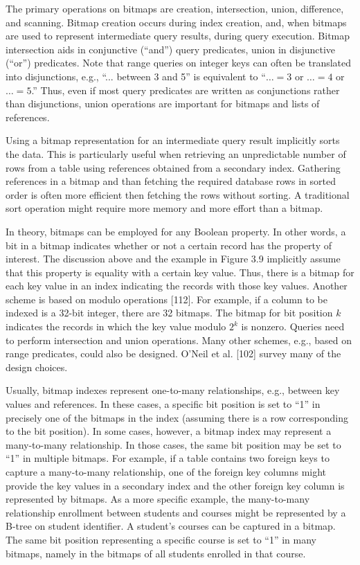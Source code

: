 The primary operations on bitmaps are creation, intersection, union,
difference, and scanning. Bitmap creation occurs during index creation,
and, when bitmaps are used to represent intermediate query results,
during query execution. Bitmap intersection aids in conjunctive
(``and'') query predicates, union in disjunctive (``or'') predicates.
Note that range queries on integer keys can often be translated into
disjunctions, e.g., ``... between 3 and 5'' is equivalent to
``$\ldots = 3$ or $\ldots = 4$ or $\ldots = 5$.'' Thus, even if
most query predicates are written as conjunctions rather than
disjunctions, union operations are important for bitmaps and lists of
references.

Using a bitmap representation for an intermediate query result
implicitly sorts the data. This is particularly useful when retrieving
an unpredictable number of rows from a table using references obtained
from a secondary index. Gathering references in a bitmap and than
fetching the required database rows in sorted order is often more
efficient then fetching the rows without sorting. A traditional sort
operation might require more memory and more effort than a bitmap.

In theory, bitmaps can be employed for any Boolean property. In other
words, a bit in a bitmap indicates whether or not a certain record has
the property of interest. The discussion above and the example in Figure
3.9 implicitly assume that this property is equality with a certain key
value. Thus, there is a bitmap for each key value in an index indicating
the records with those key values. Another scheme is based on modulo
operations {[}112{]}. For example, if a column to be indexed is a 32-bit
integer, there are 32 bitmaps. The bitmap for bit position $k$
indicates the records in which the key value modulo
$2^k$ is nonzero. Queries need to perform
intersection and union operations. Many other schemes, e.g., based on
range predicates, could also be designed. O'Neil et al. {[}102{]} survey
many of the design choices.

Usually, bitmap indexes represent one-to-many relationships, e.g.,
between key values and references. In these cases, a specific bit
position is set to ``1'' in precisely one of the bitmaps in the index
(assuming there is a row corresponding to the bit position). In some
cases, however, a bitmap index may represent a many-to-many
relationship. In those cases, the same bit position may be set to ``1''
in multiple bitmaps. For example, if a table contains two foreign keys
to capture a many-to-many relationship, one of the foreign key columns
might provide the key values in a secondary index and the other foreign
key column is represented by bitmaps. As a more specific example, the
many-to-many relationship enrollment between students and courses might
be represented by a B-tree on student identifier. A student's courses
can be captured in a bitmap. The same bit position representing a
specific course is set to ``1'' in many bitmaps, namely in the bitmaps
of all students enrolled in that course.

